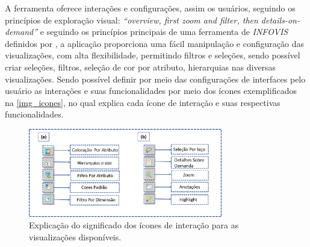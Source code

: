 \documentclass[
	12pt,				%
	openright,			%
	oneside,			%
	a4paper,			%
	english,			%
	brazil				%
	]{abntex2}
\begin{document}
A ferramenta oferece interações e configurações, assim os usuários, seguindo os princípios de exploração visual:  \textit{“overview, first zoom and filter, then details-on-demand”} e seguindo os princípios principais de uma ferramenta de \textit{INFOVIS} definidos por \cite{Shneiderman1996}, a aplicação proporciona uma fácil manipulação e configuração das visualizações, com alta flexibilidade, permitindo filtros e seleções, sendo possível criar seleções, filtros, seleção de cor por atributo, hierarquias nas diversas visualizações. Sendo possível definir por meio das configurações de interfaces pelo usuário as interações e suas funcionalidades por meio dos ícones exemplificados na \autoref{img_icones}, no qual explica cada ícone de interação e suas respectivas funcionalidades.


\begin{figure}
	\caption{\label{img_icones}  Explicação do significado dos ícones de interação para as visualizações disponíveis.
}
	\begin{center}
	    \includegraphics[width=20pc,scale=1]{figures/img_icones.png}
	\end{center}
\end{figure}

     
\end{document}
